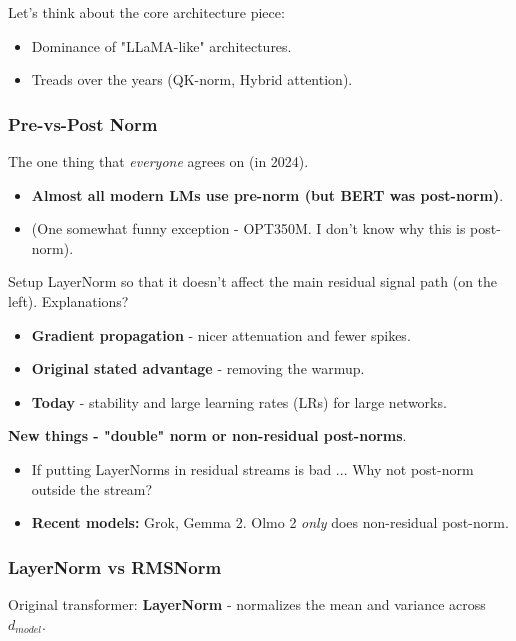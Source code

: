 \documentclass[12pt,twoside]{article}
\begin{document}
Let's think about the core architecture piece:

\begin{itemize}
    \item Dominance of "LLaMA-like" architectures.
    \item Treads over the years (QK-norm, Hybrid attention).
\end{itemize}

\subsubsection*{Pre-vs-Post Norm}

The one thing that \textit{everyone} agrees on (in 2024).

\begin{itemize}
    \item \textbf{Almost all modern LMs use pre-norm (but BERT was post-norm)}.
    \item (One somewhat funny exception - OPT350M. I don't know why this is post-norm).
\end{itemize}

Setup LayerNorm so that it doesn't affect the main residual signal path (on the left). Explanations?

\begin{itemize}
    \item \textbf{Gradient propagation} - nicer attenuation and fewer spikes.
    \item \textbf{Original stated advantage} - removing the warmup.
    \item \textbf{Today} - stability and large learning rates (LRs) for large networks. 
\end{itemize}

\textbf{New things - "double" norm or non-residual post-norms}. 

\begin{itemize}
    \item If putting LayerNorms in residual streams is bad ... Why not post-norm outside the stream?
    \item \textbf{Recent models:} Grok, Gemma 2. Olmo 2 \textit{only} does non-residual post-norm.
\end{itemize}

\subsubsection*{LayerNorm vs RMSNorm}

Original transformer: \textbf{LayerNorm} - normalizes the mean and variance across \(d_{model}\). 
\end{document}
